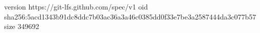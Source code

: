 version https://git-lfs.github.com/spec/v1
oid sha256:5acd1343b91dc8ddc7b03ac36a3a46c0385dd0f33e7be3a2587444da3c077b57
size 349692
